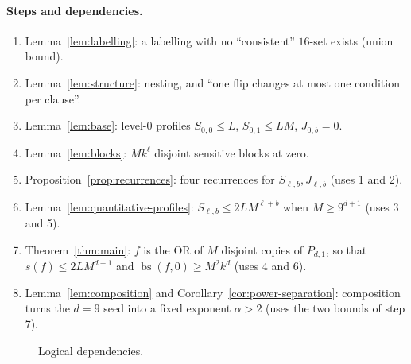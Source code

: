 \documentclass[11pt]{article}
\newcommand{\bs}{\operatorname{bs}}
\theoremstyle{definition}
\theoremstyle{remark}
\begin{document}
\paragraph{Steps and dependencies.}
\begin{enumerate}[leftmargin=2em]
\item Lemma~\ref{lem:labelling}: a labelling with no ``consistent'' \(16\)-set
exists (union bound).
\item Lemma~\ref{lem:structure}: nesting, and ``one flip changes at most one
condition per clause''.
\item Lemma~\ref{lem:base}: level-\(0\) profiles \(S_{0,0}\le L\),
\(S_{0,1}\le LM\), \(J_{0,b}=0\).
\item Lemma~\ref{lem:blocks}: \(Mk^\ell\) disjoint sensitive blocks at zero.
\item Proposition~\ref{prop:recurrences}: four recurrences for
\(S_{\ell,b},J_{\ell,b}\) (uses 1 and 2).
\item Lemma~\ref{lem:quantitative-profiles}:
\(S_{\ell,b}\le2LM^{\ell+b}\) when \(M\ge9^{d+1}\) (uses 3 and 5).
\item Theorem~\ref{thm:main}: \(f\) is the OR of \(M\) disjoint copies of
\(P_{d,1}\), so that \(s(f)\le 2LM^{d+1}\) and \(\bs(f,0)\ge M^2k^d\) (uses 4 and 6).
\item Lemma~\ref{lem:composition} and Corollary~\ref{cor:power-separation}:
composition turns the \(d=9\) seed into a fixed exponent \(\alpha>2\) (uses the
two bounds of step 7).
\end{enumerate}

\begin{figure}[htbp]
\centering
{}
\caption{Logical dependencies.}
\label{fig:dependencies}
\end{figure}
\end{document}
